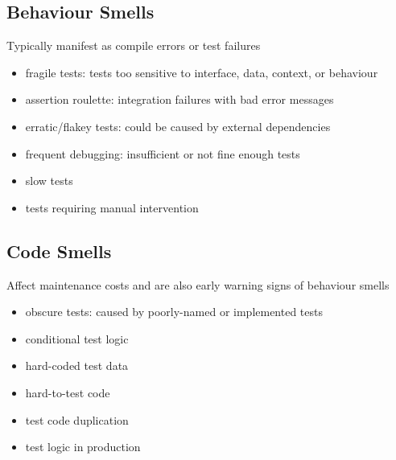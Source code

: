 \documentclass[]{article}
\theoremstyle{definition}
\begin{document}
	\subsection{Behaviour Smells}
	Typically manifest as compile errors or test failures
	\begin{itemize}
		\item fragile tests: tests too sensitive to interface, data, context, or behaviour
		\item assertion roulette: integration failures with bad error messages
		\item erratic/flakey tests: could be caused by external dependencies
		\item frequent debugging: insufficient or not fine enough tests
		\item slow tests
		\item tests requiring manual intervention
	\end{itemize}

	\subsection{Code Smells}
	Affect maintenance costs and are also early warning signs of behaviour smells

	\begin{itemize}
		\item obscure tests: caused by poorly-named or implemented tests
		\item conditional test logic
		\item hard-coded test data
		\item hard-to-test code
		\item test code duplication
		\item test logic in production
	\end{itemize}
\end{document}
